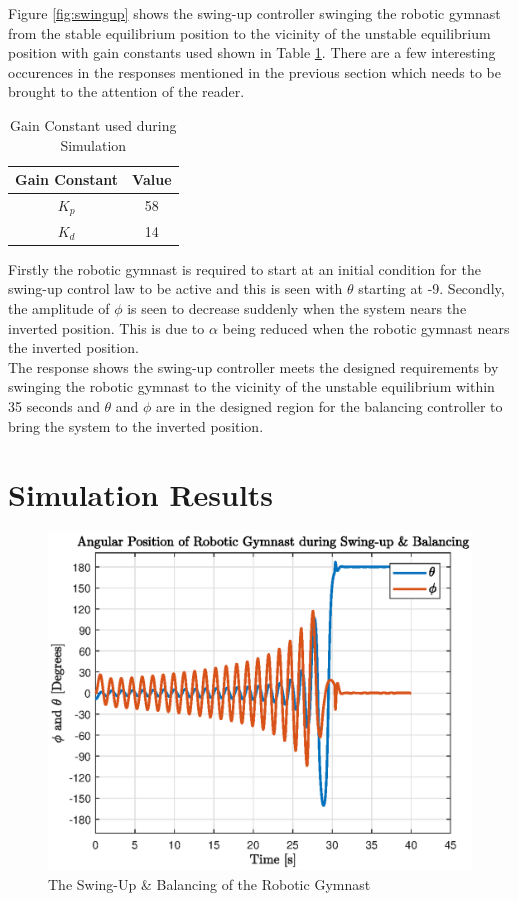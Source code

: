 Figure \ref{fig:swingup} shows the swing-up controller swinging the robotic gymnast from the stable equilibrium position to the vicinity of the unstable equilibrium position with gain constants used shown in Table \ref{table:gain_constants}. There are a few interesting occurences in the responses mentioned in the previous section which needs to be brought to the attention of the reader.\\

\begin{table}[]
	\centering
	\begin{tabular}{|c|c|}
		\hline
		Gain Constant & Value \\
		\hline
		\hline
		$K_{p}$  & 58 \\
		\hline
		$K_{d}$  & 14 \\
		\hline
	\end{tabular}
	\caption{Gain Constant used during Simulation}
	\label{table:gain_constants}
	\end{table}

Firstly the robotic gymnast is required to start at an initial condition for the swing-up control law to be active and this is seen with $\theta$ starting at -9\textdegree. Secondly, the amplitude of $\phi$ is seen to decrease suddenly when the system nears the inverted position. This is due to $\alpha$ being reduced when the robotic gymnast nears the inverted position.\\

The response shows the swing-up controller meets the designed requirements by swinging the robotic gymnast to the vicinity of the unstable equilibrium within 35 seconds and $\theta$ and $\phi$ are in the designed region for the balancing controller to bring the system to the inverted position.



\section{Simulation Results}
\begin{figure}[h]
	\centering
	\includegraphics[scale=0.9]{./figs/swingup_balance}
	\caption{The Swing-Up \& Balancing of the Robotic Gymnast}
	\label{fig:swingup_balance}
\end{figure}

